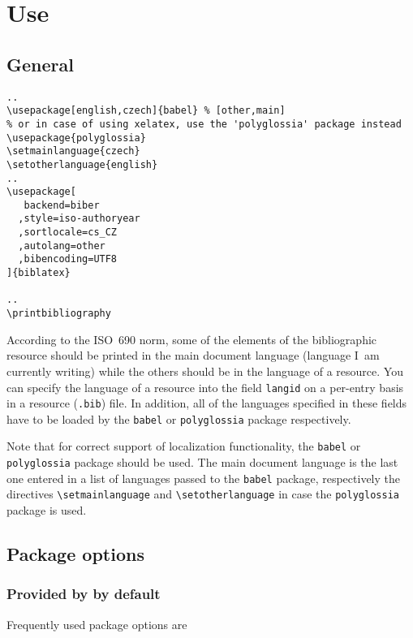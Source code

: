\documentclass[a4paper,10pt]{ltxdockit}
\def\t|#1|{\texttt{#1}}
\newcommand*{\biblatex}{\sty{biblatex}\xspace}
\begin{document}
\section{Use}

\subsection{General}

\begin{verbatim}
..
\usepackage[english,czech]{babel} % [other,main]
% or in case of using xelatex, use the 'polyglossia' package instead
\usepackage{polyglossia}
\setmainlanguage{czech}
\setotherlanguage{english}
..
\usepackage[
   backend=biber
  ,style=iso-authoryear
  ,sortlocale=cs_CZ
  ,autolang=other
  ,bibencoding=UTF8
]{biblatex}

..
\printbibliography

\end{verbatim}

According to the ISO~690 norm, some of the elements of the bibliographic
resource should be printed in the main document language (language I~am
currently writing) while the others should be in the language of a resource. You can
specify the language of a resource into the field \t|langid| on a per-entry
basis in a resource (\t|.bib|) file. In addition, all of the languages
specified in these fields have to be loaded by the \t|babel| or \t|polyglossia|
package respectively.\label{gen:multilang}

Note that for correct support of localization functionality, the \t|babel|
or \t|polyglossia| package should be used. The main document language
is the last one entered in a list of languages passed to the \t|babel| package,
respectively the directives \t|\textbackslash setmainlanguage| and
\t|\textbackslash setotherlanguage| in case the \t|polyglossia| package
is used.

\subsection{Package options}

\subsubsection{Provided by \biblatex by default}

Frequently used package options are
\end{document}
